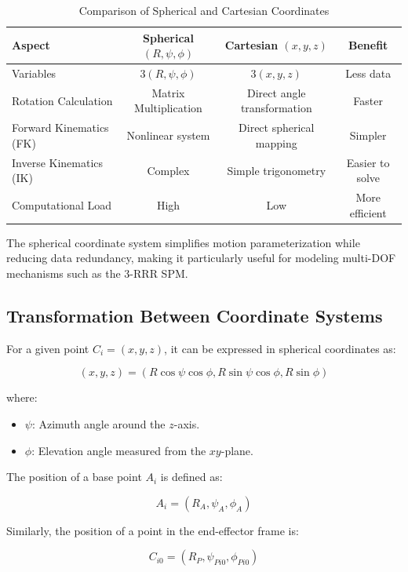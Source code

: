 \documentclass[letterpaper, 10 pt, conference]{ieeeconf}  %
\begin{document}
\begin{table}[t]
\centering
\caption{Comparison of Spherical and Cartesian Coordinates}
\label{tab:coords}
\begin{tabular}{@{}lccc@{}}
\toprule
\textbf{Aspect} & \textbf{Spherical $(R, \psi, \phi)$} & \textbf{Cartesian $(x, y, z)$} & \textbf{Benefit} \\
\midrule
Variables & $3(R, \psi, \phi)$ & $3(x, y, z)$ & Less data \\
Rotation Calculation & Matrix Multiplication & Direct angle transformation & Faster \\
Forward Kinematics (FK) & Nonlinear system & Direct spherical mapping & Simpler \\
Inverse Kinematics (IK) & Complex & Simple trigonometry & Easier to solve \\
Computational Load & High & Low & More efficient \\
\bottomrule
\end{tabular}
\end{table}
The spherical coordinate system simplifies motion parameterization while reducing data redundancy, making it particularly useful for modeling multi-DOF mechanisms such as the 3-RRR SPM.

\subsection{Transformation Between Coordinate Systems}
For a given point $C_i = (x, y, z)$, it can be expressed in spherical coordinates as:

\begin{equation}
(x, y, z) = (R \cos\psi \cos\phi, R \sin\psi \cos\phi, R \sin\phi)
\end{equation}

where:
\begin{itemize}
    \item $\psi$: Azimuth angle around the $z$-axis.
    \item $\phi$: Elevation angle measured from the $xy$-plane.
\end{itemize}

The position of a base point $A_i$ is defined as:

\begin{equation}
A_i = (R_A, \psi_A, \phi_A)
\end{equation}

Similarly, the position of a point in the end-effector frame is:

\begin{equation}
C_{i0} = (R_P, \psi_{Pi0}, \phi_{Pi0})
\end{equation}
\end{document}
